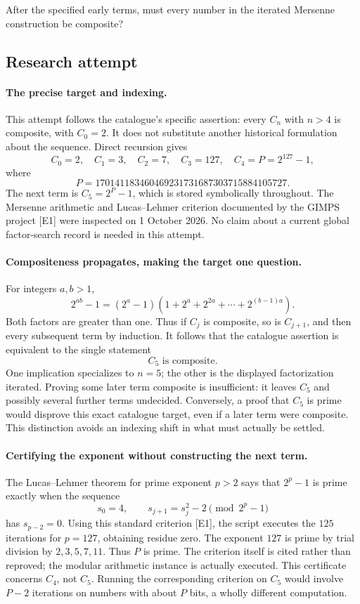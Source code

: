 \documentclass[11pt,a4paper]{article}
\begin{document}
After the specified early terms, must every number in the iterated Mersenne construction be composite?

\subsection{Research attempt}

\paragraph{The precise target and indexing.}
This attempt follows the catalogue's specific assertion: every $C_n$
with $n>4$ is composite, with $C_0=2$. It does not substitute another
historical formulation about the sequence. Direct recursion gives
\[
 C_0=2,\quad C_1=3,\quad C_2=7,\quad C_3=127,\quad
 C_4=P=2^{127}-1,
\]
where
\[
 P=170141183460469231731687303715884105727.
\]
The next term is $C_5=2^P-1$, which is stored symbolically throughout.
The Mersenne arithmetic and Lucas--Lehmer criterion documented by the
GIMPS project [E1] were inspected on 1 October 2026. No claim about a
current global factor-search record is needed in this attempt.

\paragraph{Compositeness propagates, making the target one question.}
For integers $a,b>1$,
\[
 2^{ab}-1=(2^a-1)(1+2^a+2^{2a}+\cdots+2^{(b-1)a}).
\]
Both factors are greater than one. Thus if $C_j$ is composite, so is
$C_{j+1}$, and then every subsequent term by induction. It follows that
the catalogue assertion is equivalent to the single statement
\[
                         C_5\text{ is composite}.
\]
One implication specializes to $n=5$; the other is the displayed
factorization iterated. Proving some later term composite is insufficient:
it leaves $C_5$ and possibly several further terms undecided. Conversely,
a proof that $C_5$ is prime would disprove this exact catalogue target,
even if a later term were composite. This distinction avoids an indexing
shift in what must actually be settled.

\paragraph{Certifying the exponent without constructing the next term.}
The Lucas--Lehmer theorem for prime exponent $p>2$ says that $2^p-1$
is prime exactly when the sequence
\[
 s_0=4,\qquad s_{j+1}=s_j^2-2\pmod{2^p-1}
\]
has $s_{p-2}=0$. Using this standard criterion [E1], the script executes
the $125$ iterations for $p=127$, obtaining residue zero. The exponent
$127$ is prime by trial division by $2,3,5,7,11$. Thus $P$ is prime.
The criterion itself is cited rather than reproved; the modular
arithmetic instance is actually executed. This certificate concerns
$C_4$, not $C_5$. Running the corresponding criterion on $C_5$ would
involve $P-2$ iterations on numbers with about $P$ bits, a wholly
different computation.
\end{document}
